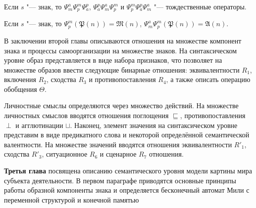 \begin{Pred}
	Если $s$ "--- знак, то  $\Psi_m^a\Psi_p^m\Psi_a^p$, $\Psi_a^p\Psi_m^a\Psi_p^m$ и $\Psi_p^m\Psi_a^p\Psi_m^a$ "--- тождественные операторы.
\end{Pred}

\begin{Pred}
	Если $s$ "--- знак, то $\Psi_p^m(\mathfrak P(n))=\mathfrak M(n)$, $\Psi_m^a\Psi_p^m(\mathfrak P(n))=\mathfrak A(n)$.
\end{Pred}	

В заключении второй главы описываются отношения на множестве компонент знака и процессы самоорганизации на множестве знаков. На синтаксическом уровне образ представляется в виде набора признаков, что позволяет на множестве образов ввести следующие бинарные отношения: эквивалентности $R_1$, включения $R_2$, сходства $R_3$ и противопоставления $R_4$, а также описать операцию обобщения $\Theta$.

Личностные смыслы определяются через множество действий. На множестве личностных смыслов вводятся отношения поглощения $\sqsubseteq$, противопоставления $\perp$ и агглютинации $\sqcup$. Наконец, элемент значения на синтаксическом уровне представим в виде предикатного слова и некоторой определённой семантической валентности. На множестве значений вводятся отношения эквивалентности $R'_1$, сходства $R'_3$, ситуационное $R_6$ и сценарное $R_7$ отношения.

\textbf{Третья глава} посвящена описанию семантического уровня модели картины мира субъекта деятельности. В первом параграфе приводятся основные принципы работы образной компоненты знака и определяется бесконечный автомат Мили с переменной структурой и конечной памятью 

